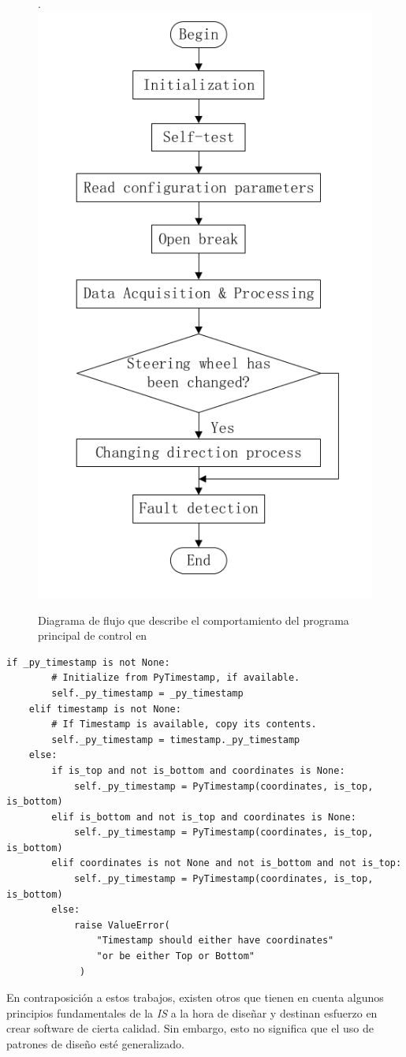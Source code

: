 \begin{figure}[H]
	\centering
	\caption{Diagrama de flujo que describe el comportamiento del programa principal de control en \cite{bad-desing-auto}}.
	\label{flujo}
    \includegraphics[width=0.5\linewidth]{main_flujo.png}
\end{figure}

\begin{lstlisting}[caption=Extracto de código de \cite{code-2}.,label={ifanidados}]
 if _py_timestamp is not None:
        # Initialize from PyTimestamp, if available.
        self._py_timestamp = _py_timestamp
    elif timestamp is not None:
        # If Timestamp is available, copy its contents.
        self._py_timestamp = timestamp._py_timestamp
    else:
        if is_top and not is_bottom and coordinates is None:
            self._py_timestamp = PyTimestamp(coordinates, is_top, is_bottom)
        elif is_bottom and not is_top and coordinates is None:
            self._py_timestamp = PyTimestamp(coordinates, is_top, is_bottom)
        elif coordinates is not None and not is_bottom and not is_top:
            self._py_timestamp = PyTimestamp(coordinates, is_top, is_bottom)
        else:
            raise ValueError(
                "Timestamp should either have coordinates"
                "or be either Top or Bottom"
             )
\end{lstlisting}


En contraposición a estos trabajos, existen otros \cite{good-desing-agrobot,good-desing-street} que tienen en cuenta algunos principios fundamentales de la \textit{IS} a la hora de diseñar y destinan esfuerzo en crear software de cierta calidad. Sin embargo, esto no significa que el uso de patrones de diseño esté generalizado.

